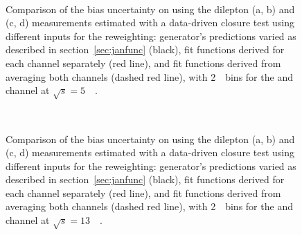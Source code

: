 \begin{figure}[h]
\centering
{}
\\
\caption{Comparison of the bias uncertainty on \ptz using the dilepton \pt (a, b) and \ut (c, d) measurements estimated with a data-driven closure test using different inputs for the reweighting: generator's predictions varied as described in section~\ref{sec:janfunc} (black), fit functions derived for each channel separately (red line), and fit functions derived from averaging both channels (dashed red line), with 2~\GeV\ bins for the \Zee and \Zmm channel at $\sqrt{s} = 5$~\TeV\ .}
\label{fig:bias_comtojan_2_5TeV}
\end{figure}
\begin{figure}[h]
\centering
{}
\\
\caption{Comparison of the bias uncertainty on \ptz using the dilepton \pt (a, b) and \ut (c, d) measurements estimated with a data-driven closure test using different inputs for the reweighting: generator's predictions varied as described in section~\ref{sec:janfunc} (black), fit functions derived for each channel separately (red line), and fit functions derived from averaging both channels (dashed red line), with 2~\GeV\ bins for the \Zee and \Zmm channel at $\sqrt{s} = 13$~\TeV\ .}
\label{fig:bias_comtojan_2_13TeV}
\end{figure}
